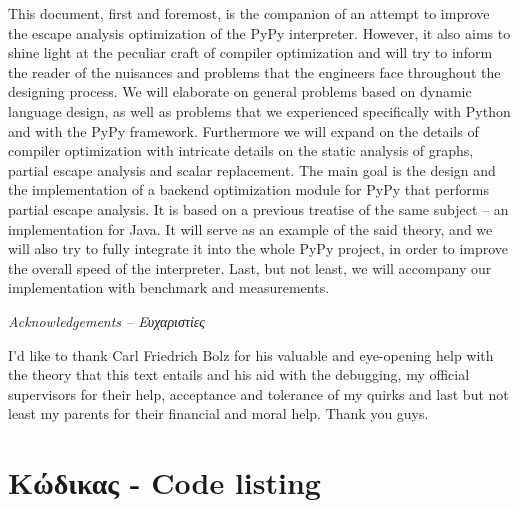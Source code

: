 \documentclass[12pt, english, singlespacing, parskip, headsepline]{MastersDoctoralThesis}
\begin{document}
This document, first and foremost, is the companion of an attempt to improve the
escape analysis optimization of the PyPy interpreter. However, it also aims to
shine light at the peculiar craft of compiler optimization and will try to
inform the reader of the nuisances and problems that the engineers face
throughout the designing process. We will elaborate on general problems based on
dynamic language design, as well as problems that we experienced specifically
with Python and with the PyPy framework. Furthermore we will expand on the
details of compiler optimization with intricate details on the static analysis
of graphs, partial escape analysis and scalar replacement. The main goal is the
design and the implementation of a backend optimization module for PyPy that
performs partial escape analysis. It is based on a previous treatise of the same
subject – an implementation for Java. It will serve as an example of the said
theory, and we will also try to fully integrate it into the whole PyPy project,
in order to improve the overall speed of the interpreter. Last, but not least,
we will accompany our implementation with benchmark and measurements.


\newpage\null\thispagestyle{empty}\newpage
\thispagestyle{plain}
\begin{center}{\huge\textit{Acknowledgements – Ευχαριστίες}\par}\end{center}
\vspace{3cm}

I'd like to thank Carl Friedrich Bolz for his valuable and eye-opening help with
the theory that this text entails and his aid with the debugging, my official
supervisors for their help, acceptance and tolerance of my quirks and last but not
least my parents for their financial and moral help. Thank you guys.


\tableofcontents


\mainmatter %

\pagestyle{thesis}









\appendix 
\chapter{Κώδικας - Code listing}


\printbibliography
\end{document}
